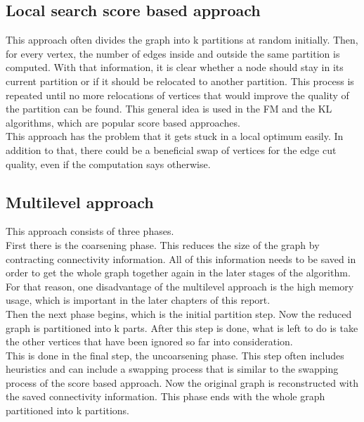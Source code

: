 \documentclass[acmsmall,nonacm,screen,review]{acmart}
\begin{document}
\subsection{Local search score based approach}
This approach often divides the graph into k partitions at random initially.
Then, for every vertex, the number of edges inside and outside the same partition is computed. With that information, it is clear whether a node should stay in its current partition or if it should be relocated to another partition. This process is repeated until no more relocations of vertices that would improve the quality of the partition can be found. This general idea is used in the FM \cite{FM} and the KL \cite{KL} algorithms, which are popular score based approaches. \\
This approach has the problem that it gets stuck in a local optimum easily. In addition to that, there could be a beneficial swap of vertices for the edge cut quality, even if the computation says otherwise.
\subsection{Multilevel approach}
This approach consists of three phases. \\
First there is the coarsening phase. This reduces the size of the graph by contracting connectivity information. All of this information needs to be saved in order to get the whole graph together again in the later stages of the algorithm. For that reason, one disadvantage of the multilevel approach is the high memory usage, which is important in the later chapters of this report. \\
Then the next phase begins, which is the initial partition step. Now the reduced graph is partitioned into k parts. After this step is done, what is left to do is take the other vertices that have been ignored so far into consideration. \\
This is done in the final step, the uncoarsening phase. This step often includes heuristics and can include a swapping process that is similar to the swapping process of the score based approach. Now the original graph is reconstructed with the saved connectivity information. This phase ends with the whole graph partitioned into k partitions.
\end{document}
